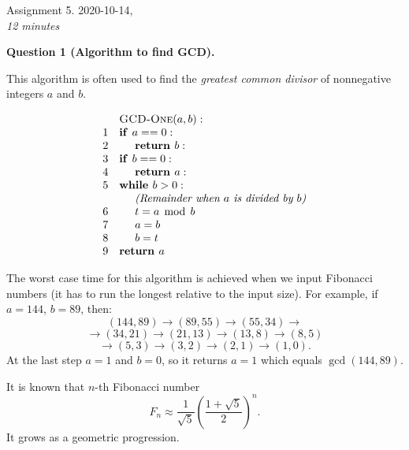 \documentclass[a4paper,12pt]{article}
\begin{document}
\thispagestyle{empty}

\twocolumn

\begin{center}
{\Large Assignment 5. 2020-10-14},\\
{\em 12 minutes} 
\end{center}


\vspace{10pt}
{\bf Question 1 (Algorithm to find GCD).} 

This algorithm is often used to find the {\em greatest common divisor}
of nonnegative integers $a$ and $b$.

\[
\begin{array}{rl}
 & \text{\textsc{GCD-One}}(a,b):\\
1 & \text{\textbf{if\ }} a == 0:\\
2 & \hspace{.5cm} \text{\textbf{return\ }} b:\\
3 & \text{\textbf{if\ }} b == 0:\\
4 & \hspace{.5cm} \text{\textbf{return\ }} a:\\
5 & \text{\textbf{while\ }} b > 0:\\
  & \hspace{.5cm} \text{\em (Remainder when $a$ is divided by $b$)}\\
6 & \hspace{.5cm} t = a\;\operatorname{mod}\;b\\
7 & \hspace{.5cm} a = b\\
8 & \hspace{.5cm} b = t\\
9 & \text{\textbf{return\ }} a\\
\end{array}
\]

The worst case time for this algorithm is achieved 
when we input Fibonacci numbers (it has to run the longest relative to the input size). 
For example, if $a = 144$, $b = 89$, then:
$$(144,89) \rightarrow (89,55) \rightarrow (55,34) \rightarrow$$
$$\rightarrow (34,21) \rightarrow (21,13) \rightarrow (13,8) \rightarrow (8,5)$$ 
$$\rightarrow (5,3) \rightarrow (3,2) \rightarrow (2,1) \rightarrow (1,0).$$
At the last step $a = 1$ and $b = 0$, so it returns $a=1$ which equals $\operatorname{gcd}(144,89)$. 

It is known that $n$-th Fibonacci number 
$${\displaystyle F_n \approx \frac{1}{\sqrt{5}}\left(\frac{1+\sqrt{5}}{2} \right)^n}.$$
It grows as a geometric progression.
\end{document}
